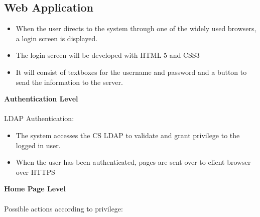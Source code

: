 \documentclass[12pt,a4paper]{article}
\begin{document}
\subsection{Web Application}
\begin{itemize}
\item When the user directs to the system through one of the widely used browsers, a login screen is displayed. 
\item The login screen will be developed with HTML 5 and CSS3
\item It will consist of textboxes for the username and password and a button to send the information to the server.
\end{itemize}
\pagebreak
\textbf{Authentication Level}\\\\
LDAP Authentication:
\begin{itemize}
\item The system accesses the CS LDAP to validate and grant privilege to the logged in user.
\item When the user has been authenticated, pages are sent over to client browser over HTTPS \\
\end{itemize}
 \textbf{Home Page Level}\\\\
Possible actions according to privilege:
\end{document}
